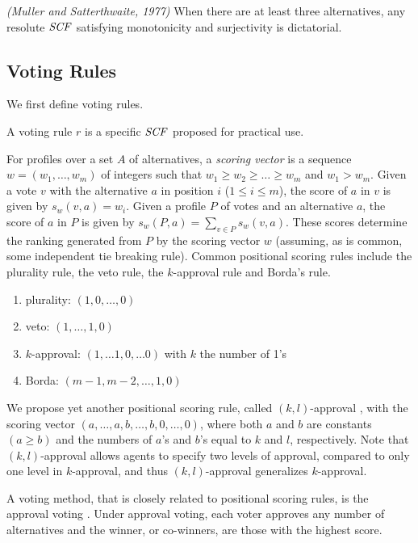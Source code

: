 \begin{thm}
\label{thm:Mull_Satt}
\emph{(Muller and Satterthwaite, 1977)}
	When there are at least three alternatives,
	any resolute $\it{SCF}$ satisfying monotonicity and surjectivity is dictatorial.
\end{thm}



\subsection{Voting Rules}
We first define voting rules.

\begin{definition}
	A voting rule $r$ is a specific $\it{SCF}$ proposed for practical use.
\end{definition}

For profiles over a set $A$ of alternatives, 
a \emph{scoring vector} is a sequence $w= (w_1,\ldots,
w_m)$ of integers such that $w_1\geq w_2 \geq \ldots \geq w_m$
and $w_1 > w_m$. Given a vote
$v$ with the alternative $a$ in position $i$ ($1 \leq i \leq m$), 
the score of $a$ in
$v$ is given
by $s_w(v,a)=w_i$. Given a profile $P$ of votes and an alternative $a$,
the score of $a$ in $P$ is given by $s_w(P,a) = \sum_{v\in P} s_w(v,a)$. 
These scores determine the ranking generated from $P$ by the scoring
vector $w$ (assuming, as is common, some independent tie breaking rule). 
Common positional scoring rules include the plurality rule,
the veto rule, the $k$-approval rule and Borda's rule.
\begin{enumerate} \itemsep -4pt
	\item plurality: $(1,0,\ldots,0)$
	\item veto: $(1,\ldots,1,0)$
	\item $k$-approval: $(1,\ldots 1,0,\ldots 0)$ with $k$ the number of 1's
	\item Borda: $(m-1,m-2,\ldots, 1,0)$
\end{enumerate}

We propose yet another positional scoring rule, called $(k,l)$-approval \cite{LiuT},
with the scoring vector $(a,\ldots,a,b,\ldots,b,0,\ldots,0)$, where
both $a$ and $b$ are constants $(a \geq b)$ and the numbers of $a$'s and $b$'s equal to
$k$ and $l$, respectively.
Note that $(k,l)$-approval allows agents to specify two levels of approval,
compared to only one level in $k$-approval, and thus $(k,l)$-approval
generalizes $k$-approval.

A voting method, that is closely related to positional scoring rules, is
the approval voting \cite{BraFis}.
Under approval voting, each voter approves any number of alternatives
and the winner, or co-winners, are those with the highest score.

